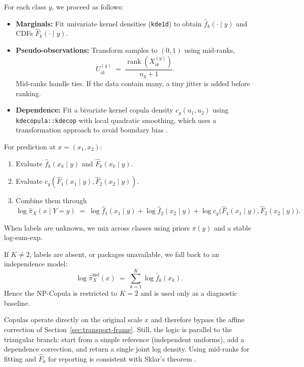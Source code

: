 \documentclass[11pt,a4paper,twoside]{book}\usepackage[]{graphicx}\usepackage[]{xcolor}
\begin{document}
For each class $y$, we proceed as follows:

\begin{itemize}
  \item \textbf{Marginals:} Fit univariate kernel densities (\texttt{kde1d}) to obtain $\widehat f_k(\cdot \mid y)$ and CDFs $\widehat F_k(\cdot \mid y)$.
  \item \textbf{Pseudo-observations:} Transform samples to $(0,1)$ using mid-ranks,
  \begin{equation}
    U_{ik}^{(y)} \;=\; \frac{\operatorname{rank}(X_{ik}^{(y)})}{n_y + 1}.
    \label{eq:copula-midranks}
  \end{equation}
Mid-ranks handle ties. If the data contain many, a tiny jitter is added before ranking.
  \item \textbf{Dependence:} Fit a bivariate kernel copula density $c_y(u_1,u_2)$ using \texttt{kdecopula::kdecop} with local quadratic smoothing, which uses a transformation approach to avoid boundary bias \citep{nagler2017kdecopula}.
\end{itemize}

For prediction at $x=(x_1,x_2)$:
\begin{enumerate}
  \item Evaluate $\widehat f_k(x_k \mid y)$ and $\widehat F_k(x_k \mid y)$.
  \item Evaluate $c_y(\widehat F_1(x_1\mid y), \widehat F_2(x_2\mid y))$.
  \item Combine them through
  \begin{equation}
    \log \widehat \pi_X(x \mid Y=y) 
      \;=\; \log \widehat f_1(x_1 \mid y) + \log \widehat f_2(x_2 \mid y)
      + \log c_y\!\Big(\widehat F_1(x_1 \mid y), \widehat F_2(x_2 \mid y)\Big).
    \label{eq:copula-logdensity}
  \end{equation}
\end{enumerate}
When labels are unknown, we mix across classes using priors $\pi(y)$ and a stable log-sum-exp.



If $K\neq 2$, labels are absent, or packages unavailable, we fall back to an independence model:
\begin{equation}
  \log \widehat \pi_X^{\mathrm{ind}}(x) \;=\; \sum_{k=1}^{K} \log \widehat f_k(x_k).
  \label{eq:copula-independence}
\end{equation}
Hence the NP-Copula is restricted to $K=2$ and is used only as a diagnostic baseline.



Copulas operate directly on the original scale $x$ and therefore bypass the affine correction of Section~\ref{sec:transport-frame}. Still, the logic is parallel to the triangular branch: start from a simple reference (independent uniforms), add a dependence correction, and return a single joint log density. Using mid-ranks for fitting and $\widehat F_k$ for reporting is consistent with Sklar's theorem \citep{sklar1959fonctions,nelsen2006introduction,joe2014dependence}.
\end{document}
